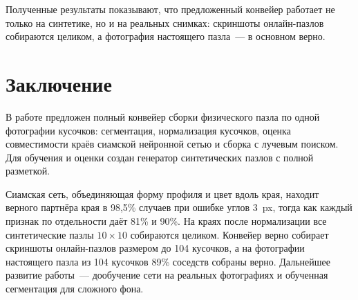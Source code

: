 \documentclass{misisarticle}
\begin{document}
Полученные результаты показывают, что предложенный конвейер работает не только на синтетике, но и на реальных снимках: скриншоты онлайн-пазлов собираются целиком, а фотография настоящего пазла~--- в основном верно.

\section{Заключение}

В работе предложен полный конвейер сборки физического пазла по одной фотографии кусочков: сегментация, нормализация кусочков, оценка совместимости краёв сиамской нейронной сетью и сборка с лучевым поиском. Для обучения и оценки создан генератор синтетических пазлов с полной разметкой.

Сиамская сеть, объединяющая форму профиля и цвет вдоль края, находит верного партнёра края в 98,5\% случаев при ошибке углов 3~px, тогда как каждый признак по отдельности даёт 81\% и 90\%. На краях после нормализации все синтетические пазлы $10\times10$ собираются целиком. Конвейер верно собирает скриншоты онлайн-пазлов размером до 104 кусочков, а на фотографии настоящего пазла из 104 кусочков 89\% соседств собраны верно. Дальнейшее развитие работы~--- дообучение сети на реальных фотографиях и обученная сегментация для сложного фона.
\end{document}

